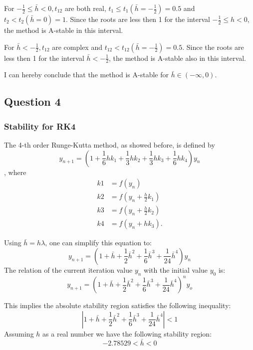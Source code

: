 \documentclass[a4paper, 11pt]{article}
\begin{document}
				For $-\frac{1}{2} \le \bar{h} < 0, t_{12}$ are both real, $t_{1} \le t_1(\bar{h}=-\frac{1}{2})= 0.5$ and $t_{2} < t_2(\bar{h}=0)= 1$.
				Since the roots are less then 1 for the interval $-\frac{1}{2} \le h < 0$, the method is A-stable in this interval.
				
				For $\bar{h} <-\frac{1}{2},  t_{12}$ are complex and $t_{12} < t_{12}(\bar{h}=-\frac{1}{2})= 0.5$.
				Since the roots are less then 1 for the interval $\bar{h} <-\frac{1}{2}$, the method is A-stable also in this interval.
				
				I can hereby conclude that the method is A-stable for $\bar{h} \in (-\infty,0)$.
						
		\subsection*{Question 4}
			\subsubsection*{Stability for RK4}
				The 4-th order Runge-Kutta method, as showed before, is defined by
				\begin{equation}
					y_{n+1} = (1 + \frac{1}{6}hk_1 + \frac{1}{3}hk_2 + \frac{1}{3}hk_3 + \frac{1}{6}hk_4)y_n
				\end{equation}
				, where
				\begin{align}
						k1 &= f(y_{n}) \\
						k2 &= f(y_{n} + \frac{h}{2} k_1) \\
						k3 &= f(y_{n} + \frac{h}{2} k_2) \\
						k4 &= f(y_{n} + h k_3).
				\end{align}
			
				Using $ \bar{h} = h\lambda $, one can simplify this equation to:
				\begin{equation}
					y_{n+1} = (1 + \bar{h} + \frac{1}{2}\bar{h}^2 + \frac{1}{6}\bar{h}^3 + \frac{1}{24}\bar{h}^4)y_n
				\end{equation}
				The relation of the current iteration value $y_n$ with the initial value $y_0$ is:
				\begin{equation}
					y_{n+1} = (1 + \bar{h} + \frac{1}{2}\bar{h}^2 + \frac{1}{6}\bar{h}^3 + \frac{1}{24}\bar{h}^4)^n y_o
				\end{equation}
			
				This implies the absolute stability region satisfies the following inequality:
				\begin{equation}
					|1 + \bar{h} + \frac{1}{2}\bar{h}^2 + \frac{1}{6}\bar{h}^3 + \frac{1}{24}\bar{h}^4| < 1 
				\end{equation}
				Assuming $h$ as a real number we have the following stability region:
				\begin{equation}
					-2.78529 < \bar{h} < 0
				\end{equation}
				
\end{document}
